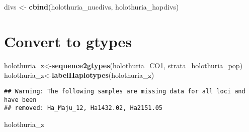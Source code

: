\documentclass[
]{article}
\newenvironment{Shaded}{\begin{snugshade}}{\end{snugshade}}
\newcommand{\DataTypeTok}[1]{\textcolor[rgb]{0.13,0.29,0.53}{#1}}
\newcommand{\KeywordTok}[1]{\textcolor[rgb]{0.13,0.29,0.53}{\textbf{#1}}}
\newcommand{\NormalTok}[1]{#1}
\newcommand{\StringTok}[1]{\textcolor[rgb]{0.31,0.60,0.02}{#1}}
\begin{document}
\begin{Shaded}
\begin{Highlighting}[]
\NormalTok{divs <-}\StringTok{ }\KeywordTok{cbind}\NormalTok{(holothuria_nucdivs, holothuria_hapdivs)}
\end{Highlighting}
\end{Shaded}

\hypertarget{convert-to-gtypes}{%
\section{Convert to gtypes}\label{convert-to-gtypes}}

\begin{Shaded}
\begin{Highlighting}[]
\NormalTok{holothuria_z<-}\KeywordTok{sequence2gtypes}\NormalTok{(holothuria_CO1, }\DataTypeTok{strata=}\NormalTok{holothuria_pop)}
\NormalTok{holothuria_z<-}\KeywordTok{labelHaplotypes}\NormalTok{(holothuria_z)}
\end{Highlighting}
\end{Shaded}

\begin{verbatim}
## Warning: The following samples are missing data for all loci and have been
## removed: Ha_Maju_12, Ha1432.02, Ha2151.05
\end{verbatim}

\begin{Shaded}
\begin{Highlighting}[]
\NormalTok{holothuria_z}
\end{Highlighting}
\end{Shaded}
\end{document}

